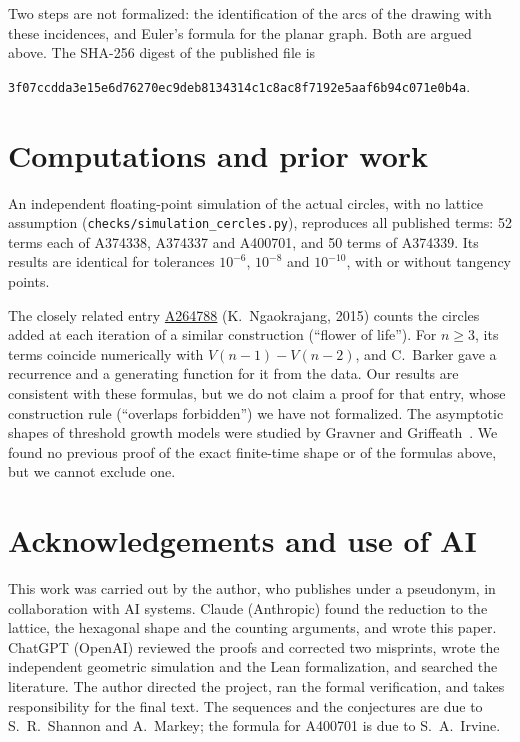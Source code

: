 \documentclass[11pt,a4paper]{amsart}
\theoremstyle{definition}
\theoremstyle{remark}
\newcommand{\oeis}[1]{\href{https://oeis.org/#1}{#1}}
\begin{document}
Two steps are not formalized: the identification of the arcs of the drawing with these incidences, and Euler's formula for the planar graph. Both are argued above. The SHA-256 digest of the published file is
\begin{center}\small\texttt{3f07ccdda3e15e6d76270ec9deb8134314c1c8ac8f7192e5aaf6b94c071e0b4a}.\end{center}

\section{Computations and prior work}

An independent floating-point simulation of the actual circles, with no lattice assumption (\texttt{checks/simulation\_cercles.py}), reproduces all published terms: 52 terms each of A374338, A374337 and A400701, and 50 terms of A374339. Its results are identical for tolerances $10^{-6}$, $10^{-8}$ and $10^{-10}$, with or without tangency points.

The closely related entry \oeis{A264788} (K.~Ngaokrajang, 2015) counts the circles added at each iteration of a similar construction (``flower of life''). For $n\ge3$, its terms coincide numerically with $V(n-1)-V(n-2)$, and C.~Barker gave a recurrence and a generating function for it from the data. Our results are consistent with these formulas, but we do not claim a proof for that entry, whose construction rule (``overlaps forbidden'') we have not formalized. The asymptotic shapes of threshold growth models were studied by Gravner and Griffeath~\cite{GG}. We found no previous proof of the exact finite-time shape or of the formulas above, but we cannot exclude one.

\section*{Acknowledgements and use of AI}

This work was carried out by the author, who publishes under a pseudonym, in collaboration with AI systems. Claude (Anthropic) found the reduction to the lattice, the hexagonal shape and the counting arguments, and wrote this paper. ChatGPT (OpenAI) reviewed the proofs and corrected two misprints, wrote the independent geometric simulation and the Lean formalization, and searched the literature. The author directed the project, ran the formal verification, and takes responsibility for the final text. The sequences and the conjectures are due to S.~R.~Shannon and A.~Markey; the formula for A400701 is due to S.~A.~Irvine.
\end{document}
